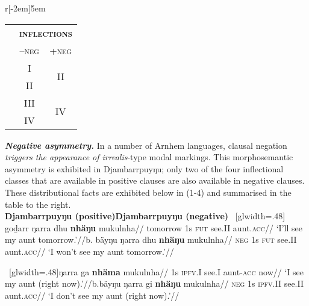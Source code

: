 \documentclass[dvipsnames,12pt]{article}%
\begin{document}
\begin{wraptable}[6]{r}[-2em]{5em}\vspace{-5ex}
	\begin{tabular}{ccc}
		&\multicolumn{2}{c}{\textsc{\textbf{inflections}}} \\
		& \textsc{--neg} & \textsc{+neg}\\\midrule
		&	\gls{I} & \multirow{2}{*}{\gls{II}}\\
		& \gls{II} \\\midrule
		&	\gls{III} & \multirow{2}{*}{\gls{IV}}\\
		& \gls{IV} \\\bottomrule
	\end{tabular}
\end{wraptable}\noindent\textbf{\textit{Negative asymmetry.}} In a number of Arnhem languages, clausal negation \textit{triggers the appearance of irrealis}-type modal markings. This morphosemantic asymmetry is exhibited in Djambarrpuyŋu; only two of the four inflectional classes that are available in positive clauses are also available in negative clauses. These distributional facts are exhibited below in (1‑4) and summarised in the table to the right.\\%






\textbf{Djambarrpuyŋu (positive)}\hspace{.22\textwidth}\textbf{Djambarrpuyŋu (negative)}\vspace{.4em}
	\pex~[glwidth=.48\textwidth]\a\begingl
	\gla goḏarr ŋarra dhu \textbf{nhäŋu} mukulnha//
	\glb tomorrow 1s \textsc{fut} see.\gls{II} aunt.\textsc{acc}//
	\glft`I'll see my aunt tomorrow.'//\endgl b.\hspace{.3em}\begingl
	\gla bäyŋu ŋarra dhu \textbf{nhäŋu} mukulnha//
	\glb \textsc{neg} 1s \textsc{fut} see.\gls{II} aunt.\textsc{acc}//
	\glft`I won't see my aunt tomorrow.'//\endgl\xe
	
	\pex~[glwidth=.48\textwidth]\a\begingl\gla ŋarra ga \textbf{nhäma} mukulnha//
	\glb  1s \textsc{ipfv.\gls{I}} see.\gls{I} aunt-\textsc{acc} now//
	\glft`I see my aunt (right now).'//\endgl b.\hspace{.3em}\begingl\gla bäyŋu ŋarra gi \textbf{nhäŋu} mukulnha//
	\glb \textsc{neg} 1s \textsc{ipfv}.\gls{II} see.\gls{II} aunt.\textsc{acc}//
	\glft`I don't see my aunt (right now).'//\endgl\xe
\end{document}
